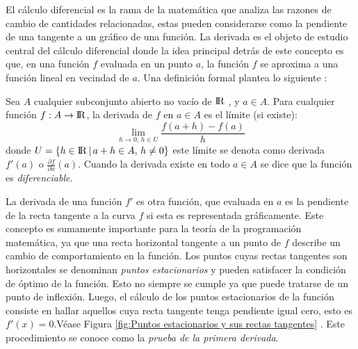 El cálculo diferencial es la rama de la matemática que analiza las razones de cambio de cantidades relacionadas, estas pueden considerarse como la pendiente de una tangente a un gráfico de una función. La derivada es el objeto de estudio central del cálculo diferencial donde la idea principal detrás de este concepto es que, en una función $f$ evaluada en un punto $a$, la función $f$ se aproxima a una función lineal en vecindad de $a$. Una definición formal plantea lo siguiente \cite{jean_algebra_2017}:
\begin{defn}

Sea $A$  cualquier subconjunto abierto no vacío de ${\rm I\!R}$ , y $a \in A$. Para cualquier función $f: A \rightarrow {\rm I\!R}$, la derivada de $f$ en $a \in A$ es el límite (si existe):
\begin{equation}
\lim_{h\to 0, \, h \in U} \frac{f(a+h)-f(a)}{h}
\end{equation}
donde $U =\{h \in {\rm I\!R}\,|\, a+h \in A, \, h \neq 0 \}$ este límite se denota como derivada $f'(a)$ o $\frac{\partial f}{\partial x}(a)$. Cuando la derivada existe en todo $a \in A$ se dice que la función es \textit{diferenciable}.
\end{defn}

La derivada de una función $f'$ es otra función, que evaluada en $a$ es la pendiente de la recta tangente a la curva $f$ si esta es representada gráficamente. Este concepto es sumamente importante para la teoría de la programación matemática, ya que una recta horizontal tangente a un punto de $f$ describe un cambio de comportamiento en la función. Los puntos cuyas rectas tangentes son horizontales se denominan \textit{puntos estacionarios} y pueden satisfacer la condición de óptimo de la función. Esto no siempre se cumple ya que puede tratarse de un punto de inflexión. Luego, el cálculo de los puntos estacionarios de la función consiste en hallar aquellos cuya recta tangente tenga pendiente igual cero, esto es $f'(x)=0$.Véase Figura \ref{fig:Puntos estacionarios y sus rectas tangentes} . Este procedimiento se conoce como la \textit{prueba de la primera derivada}.

